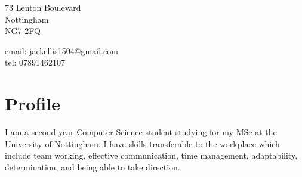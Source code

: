 \documentclass[12pt, a4paper]{article}
\begin{document}

\begin{minipage}[c]{.5\textwidth}
  \raggedright
  73 Lenton Boulevard\\
  Nottingham\\
  NG7 2FQ
\end{minipage}
\begin{minipage}[c]{.5\textwidth}
  \raggedleft
  email: jackellis1504@gmail.com\\
  tel: 07891462107
\end{minipage}

\vspace{5mm}

\section*{Profile}
I am a second year Computer Science student studying for my MSc at the University of Nottingham.
I have skills transferable to the workplace which include team working, effective communication, time management, adaptability, determination, and being able to take direction.
\end{document}
